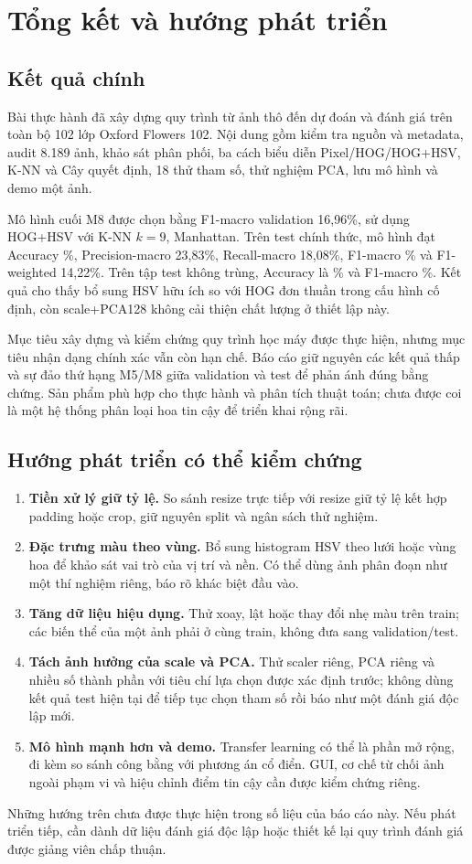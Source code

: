 \section{Tổng kết và hướng phát triển}
\subsection{Kết quả chính}
Bài thực hành đã xây dựng quy trình từ ảnh thô đến dự đoán và đánh giá trên toàn bộ 102 lớp Oxford Flowers 102. Nội dung gồm kiểm tra nguồn và metadata, audit 8.189 ảnh, khảo sát phân phối, ba cách biểu diễn Pixel/HOG/HOG+HSV, K-NN và Cây quyết định, 18 thử tham số, thử nghiệm PCA, lưu mô hình và demo một ảnh.

Mô hình cuối M8 được chọn bằng F1-macro validation 16,96\%, sử dụng HOG+HSV với K-NN \(k=9\), Manhattan. Trên test chính thức, mô hình đạt Accuracy \TestAccuracy\%, Precision-macro 23,83\%, Recall-macro 18,08\%, F1-macro \TestFOne\% và F1-weighted 14,22\%. Trên tập test không trùng, Accuracy là \CleanAccuracy\% và F1-macro \CleanFOne\%. Kết quả cho thấy bổ sung HSV hữu ích so với HOG đơn thuần trong cấu hình cố định, còn scale+PCA128 không cải thiện chất lượng ở thiết lập này.

Mục tiêu xây dựng và kiểm chứng quy trình học máy được thực hiện, nhưng mục tiêu nhận dạng chính xác vẫn còn hạn chế. Báo cáo giữ nguyên các kết quả thấp và sự đảo thứ hạng M5/M8 giữa validation và test để phản ánh đúng bằng chứng. Sản phẩm phù hợp cho thực hành và phân tích thuật toán; chưa được coi là một hệ thống phân loại hoa tin cậy để triển khai rộng rãi.

\subsection{Hướng phát triển có thể kiểm chứng}
\begin{enumerate}
\item \textbf{Tiền xử lý giữ tỷ lệ.} So sánh resize trực tiếp với resize giữ tỷ lệ kết hợp padding hoặc crop, giữ nguyên split và ngân sách thử nghiệm.
\item \textbf{Đặc trưng màu theo vùng.} Bổ sung histogram HSV theo lưới hoặc vùng hoa để khảo sát vai trò của vị trí và nền. Có thể dùng ảnh phân đoạn như một thí nghiệm riêng, báo rõ khác biệt đầu vào.
\item \textbf{Tăng dữ liệu hiệu dụng.} Thử xoay, lật hoặc thay đổi nhẹ màu trên train; các biến thể của một ảnh phải ở cùng train, không đưa sang validation/test.
\item \textbf{Tách ảnh hưởng của scale và PCA.} Thử scaler riêng, PCA riêng và nhiều số thành phần với tiêu chí lựa chọn được xác định trước; không dùng kết quả test hiện tại để tiếp tục chọn tham số rồi báo như một đánh giá độc lập mới.
\item \textbf{Mô hình mạnh hơn và demo.} Transfer learning có thể là phần mở rộng, đi kèm so sánh công bằng với phương án cổ điển. GUI, cơ chế từ chối ảnh ngoài phạm vi và hiệu chỉnh điểm tin cậy cần được kiểm chứng riêng.
\end{enumerate}
Những hướng trên chưa được thực hiện trong số liệu của báo cáo này. Nếu phát triển tiếp, cần dành dữ liệu đánh giá độc lập hoặc thiết kế lại quy trình đánh giá được giảng viên chấp thuận.
